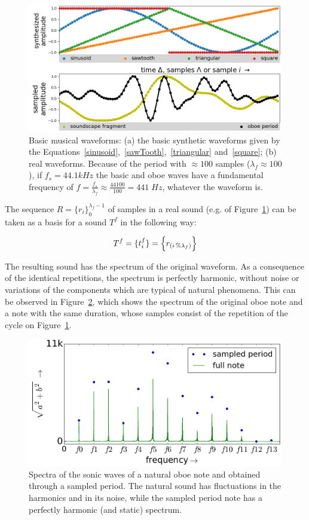 \begin{figure}
    \centering
        \includegraphics[width=.7\textwidth]{figures/waveForms__}
    \caption{Basic musical waveforms: (a) the basic synthetic  waveforms
	given by the Equations~\ref{sinusoid},~\ref{sawTooth},~\ref{triangular} and~\ref{square};
	(b) real waveforms.
	Because of the period with $\approx 100$ samples ($\lambda_f\approx 100$),
	if $f_s=44.1kHz$
	the basic and oboe waves have a fundamental frequency of $f=\frac{f_s}{\lambda_f}\approx \frac{44100}{100} = 441 \; Hz$,
	whatever the waveform is.}
        \label{fig:formasDeOnda}
\end{figure}

The sequence $R=\{ r_i \}_0^{\lambda_f-1}$ of samples in a real sound (e.g. of Figure~\ref{fig:formasDeOnda}) can be taken as a basis for a sound $T^f$ in the following way:

\begin{equation}\label{sampleandoFormaDeOnda}
     T^f=\{ t_i^f \}=\Bigl\{ r_{(i\,\%\lambda_{f})} \Bigr\}
\end{equation}

The resulting sound has the spectrum of the original waveform.
As a consequence of the identical repetitions,
the spectrum is perfectly harmonic,
without noise or variations of the components
which are typical of natural phenomena.
This can be observed in Figure~\ref{fig:espectroOboe},
which shows the spectrum of the original oboe note and a note with the same duration,
whose samples consist of the repetition of the cycle on Figure~\ref{fig:formasDeOnda}.

\begin{figure}
    \centering
        \includegraphics[width=.7\textwidth]{figures/oboeNaturalSampledSpectrum_}
	\caption{Spectra of the sonic waves of a natural oboe note and obtained through a sampled period. The natural sound has fluctuations in the harmonics and in its noise, while the sampled period note has a perfectly harmonic (and static) spectrum.}
        \label{fig:espectroOboe}
\end{figure}

